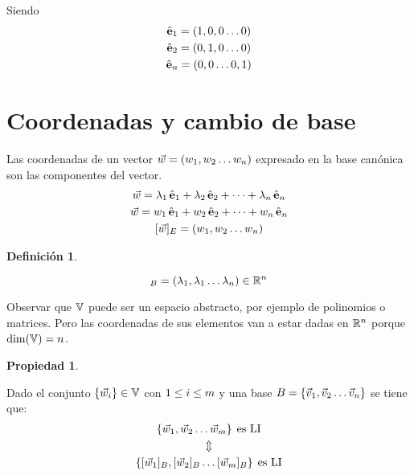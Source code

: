 \documentclass[a5paper,12pt,twoside]{book}
\newtheorem{defn}{{Definición}}[chapter]
\newtheorem{prop}{{Propiedad}}[chapter]
\begin{document}
Siendo
\begin{gather*}
    \hat{\textbf{e}}_1 = (1,0,0 \dots 0)
    \\
    \hat{\textbf{e}}_2 = (0,1,0 \dots 0)
    \\
    \hat{\textbf{e}}_n = (0,0 \dots 0,1)
\end{gather*}


\section{Coordenadas y cambio de base}

Las coordenadas de un vector $\Vec{w}=(w_1,w_2 \dots w_n)$ expresado en la base canónica son las componentes del vector.
\begin{gather*}
    \Vec{w} = \lambda_1 \, \hat{\textbf{e}}_1 + \lambda_2 \, \hat{\textbf{e}}_2 + \dots + \lambda_n \, \hat{\textbf{e}}_n
    \\
    \Vec{w} = w_1 \, \hat{\textbf{e}}_1 + w_2 \, \hat{\textbf{e}}_2 + \dots + w_n \, \hat{\textbf{e}}_n
    \\
    [\Vec{w}]_E = (w_1,w_2 \dots w_n)
\end{gather*}

\begin{mdframed}[style=DefinitionFrame]
    \begin{defn}
    \end{defn}
    \begin{equation*}
        [\Vec{w}]_B = (\lambda_1,\lambda_1 \dots \lambda_\nth) \in \setR^\nth
    \end{equation*}
\end{mdframed}

Observar que $\mathbb{V}$ puede ser un espacio abstracto, por ejemplo de polinomios o matrices.
Pero las coordenadas de sus elementos van a estar dadas en $\mathbb{R}^n$ porque $\operatorname{dim}(\mathbb{V})=n$.

\begin{mdframed}[style=PropertyFrame]
    \begin{prop}
    \end{prop}
    Dado el conjunto ${ \left\{ {\Vec{w}_i} \right\} } \in \mathbb{V}$ con $1\leq i\leq m$ y una base $B={ \left\{ {\Vec{v}_1,\Vec{v}_2 \dots \Vec{v}_n} \right\} }$ se tiene que:
    \begin{gather*}
        { \left\{ {\Vec{w}_1,\Vec{w}_2 \dots \Vec{w}_m} \right\} } \hspace{1ex} \textrm{es LI}
        \\
        \Updownarrow
        \\
        { \left\{ {[\Vec{w}_1]_B , [\Vec{w}_2]_B \dots [\Vec{w}_m]_B} \right\} } \hspace{1ex} \textrm{es LI}
    \end{gather*}
\end{mdframed}
\end{document}

